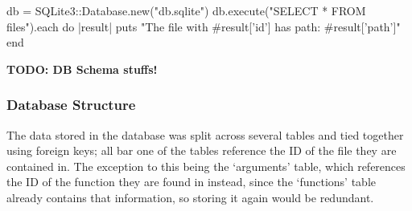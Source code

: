     \begin{code}[language=ruby, gobble=6]
      db = SQLite3::Database.new("db.sqlite")
      db.execute("SELECT * FROM files").each do |result|
        puts "The file with #{result['id']} has path: #{result['path']}"
      end
    \end{code}

    \textbf{TODO: DB Schema stuffs!}




    \subsubsection{Database Structure}
      The data stored in the database was split across several tables and tied
      together using foreign keys; all bar one of the tables reference the ID of
      the file they are contained in. The exception to this being the
      `arguments' table, which references the ID of the function they are found
      in instead, since the `functions' table already contains that information,
      so storing it again would be redundant.

